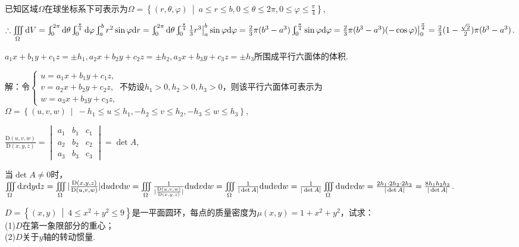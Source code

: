 \documentclass[12pt,UTF8]{ctexart}
\newcommand\Set[2]{\left\{#1\ \middle\vert\ #2 \right\}}
\newcommand{\Int}[4]{\varint\nolimits_{#1}^{#2}#3\mathrm d#4}
\newcommand{\IIInt}[3]{\iiint\limits_{#1}#2\mathrm d#3}
\newcommand{\varIIInt}[5]{\iiint\limits_{#1}#2\mathrm d#3\mathrm d#4\mathrm d#5}
\begin{document}
\begin{enumerate}
已知区域$\Omega$在球坐标系下可表示为$\Omega=\Set{(r,\theta,\varphi)}{a\leqslant r\leqslant b,0\leqslant\theta\leqslant2\pi,0\leqslant\varphi\leqslant\frac\pi4}$,

$\therefore\IIInt\Omega{}V=\Int0{2\pi}{}\theta\Int0{\frac\pi4}{}\varphi\Int ab{r^2\sin\varphi}r=\Int0{2\pi}{}\theta\Int0{\frac\pi4}{\frac13r^3\big|_a^b\sin\varphi}\varphi=\frac23\pi(b^3-a^3)\Int0{\frac\pi4}{\sin\varphi}\varphi\\
=\frac23\pi(b^3-a^3)(-\cos\varphi)\big|_0^{\frac\pi4}=\frac23(1-\frac{\sqrt2}2)\pi(b^3-a^3)$.

$a_1x+b_1y+c_1z=\pm h_1,a_2x+b_2y+c_2z=\pm h_2,a_3x+b_3y+c_3z=\pm h_3$所围成平行六面体的体积.

解：令$\begin{cases}
u=a_1x+b_1y+c_1z,\\
v=a_2x+b_2y+c_2z,\\
w=a_3x+b_3y+c_3z,
\end{cases}$不妨设$h_1>0,h_2>0,h_3>0$，则该平行六面体可表示为$\Omega=\Set{(u,v,w)}{-h_1\leqslant u\leqslant h_1,-h_2\leqslant v\leqslant h_2,-h_3\leqslant w\leqslant h_3}$,

$\frac{\mathrm D(u,v,w)}{\mathrm D(x,y,z)}=\begin{vmatrix}
a_1&b_1&c_1\\
a_2&b_2&c_2\\
a_3&b_3&c_3
\end{vmatrix}=\det A$,

当$\det A\neq0$时，\\
$\varIIInt\Omega{}xyz=\varIIInt\Omega{|\frac{\mathrm D(x,y,z)}{\mathrm D(u,v,w)}|}uvw=\varIIInt\Omega{\frac1{|\frac{\mathrm D(u,v,w)}{\mathrm D(x,y,z)}|}}uvw=\varIIInt\Omega{\frac1{|\det A|}}uvw\\
=\frac1{|\det A|}\varIIInt\Omega{}uvw=\frac{2h_1\cdot2h_2\cdot2h_3}{|\det A|}=\frac{8h_1h_2h_3}{|\det A|}$.

$D=\Set{(x,y)}{4\leqslant x^2+y^2\leqslant9}$是一平面圆环，每点的质量密度为$\mu(x,y)=1+x^2+y^2$，试求：\\
(1)$D$在第一象限部分的重心；\\
(2)$D$关于$y$轴的转动惯量.


\end{enumerate}
\end{document}
